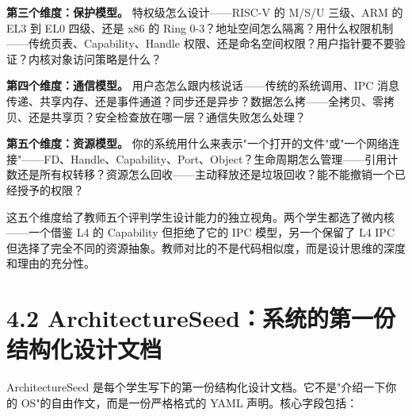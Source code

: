 \documentclass[UTF8,a4paper,12pt,openany]{ctexrep}
\begin{document}
\textbf{第三个维度：保护模型。} 特权级怎么设计------RISC-V 的 M/S/U 三级、ARM 的 EL3 到 EL0 四级、还是 x86 的 Ring 0-3？地址空间怎么隔离？用什么权限机制------传统页表、Capability、Handle 权限、还是命名空间权限？用户指针要不要验证？内核对象访问策略是什么？

\textbf{第四个维度：通信模型。} 用户态怎么跟内核说话------传统的系统调用、IPC 消息传递、共享内存、还是事件通道？同步还是异步？数据怎么拷------全拷贝、零拷贝、还是共享页？安全检查放在哪一层？通信失败怎么处理？

\textbf{第五个维度：资源模型。} 你的系统用什么来表示"一个打开的文件"或"一个网络连接"------FD、Handle、Capability、Port、Object？生命周期怎么管理------引用计数还是所有权转移？资源怎么回收------主动释放还是垃圾回收？能不能撤销一个已经授予的权限？

这五个维度给了教师五个评判学生设计能力的独立视角。两个学生都选了微内核------一个借鉴 L4 的 Capability 但拒绝了它的 IPC 模型，另一个保留了 L4 IPC 但选择了完全不同的资源抽象。教师对比的不是代码相似度，而是设计思维的深度和理由的充分性。

\section{4.2 ArchitectureSeed：系统的第一份结构化设计文档}\label{42-architectureseedux7cfbux7edfux7684ux7b2cux4e00ux4efdux7ed3ux6784ux5316ux8bbeux8ba1ux6587ux6863}

ArchitectureSeed 是每个学生写下的第一份结构化设计文档。它不是"介绍一下你的 OS"的自由作文，而是一份严格格式的 YAML 声明。核心字段包括：
\end{document}
